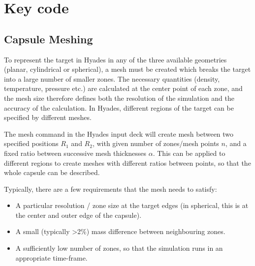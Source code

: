 

\chapter{\label{app:1-cardiophys} Key code}

\minitoc


\section{Capsule Meshing}
To represent the target in Hyades in any of the three available geometries (planar, cylindrical or spherical), a mesh must be created which breaks the target into a large number of smaller zones. The necessary quantities (density, temperature, pressure etc.) are calculated at the center point of each zone, and the mesh size therefore defines both the resolution of the simulation and the accuracy of the calculation. In Hyades, different regions of the target can be specified by different meshes. 

The mesh command in the Hyades input deck will create mesh between two specified positions $R_1$ and $R_2$, with given number of zones/mesh points $n$, and a fixed ratio between successive mesh thicknesses $\alpha$. This can be applied to different regions to create meshes with different ratios between points, so that the whole capsule can be described.

Typically, there are a few requirements that the mesh needs to satisfy:
\begin{itemize}
    \item A particular resolution / zone size at the target edges (in spherical, this is at the center and outer edge of the capsule).
    \item A small (typically >2\%) mass difference between neighbouring zones.
    \item A sufficiently low number of zones, so that the simulation runs in an appropriate time-frame.
\end{itemize}

